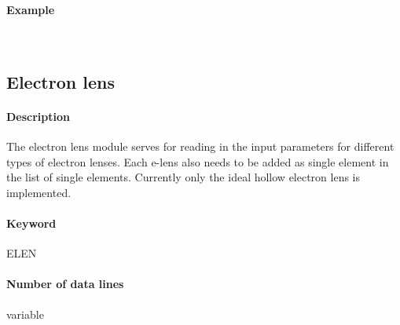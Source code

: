 \documentclass[a4paper,11pt]{report}
\begin{document}
\paragraph{Example}~\\


\subsection{Electron lens} \label{sec:elen}

\paragraph{Description} The electron lens module serves for reading in the input parameters for different types of electron lenses. Each e-lens also needs to be added as single element in the list of single elements. Currently only the ideal hollow electron lens is implemented.

\paragraph{Keyword} ELEN

\paragraph{Number of data lines} variable
\end{document}
